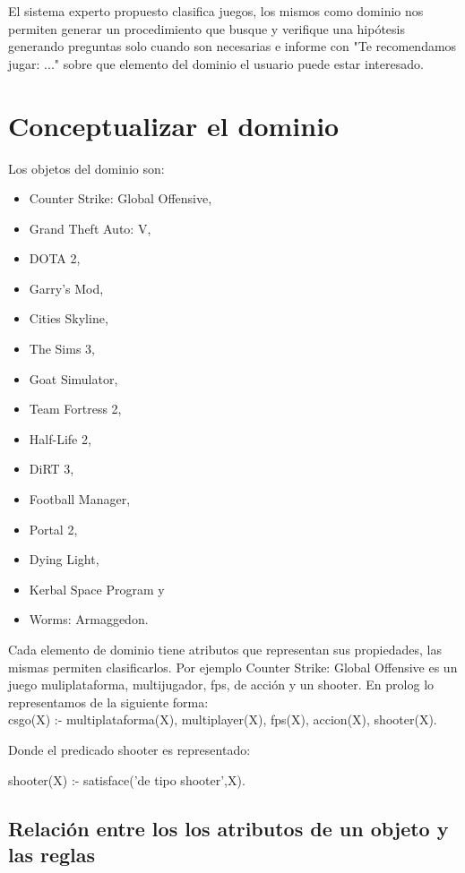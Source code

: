 \documentclass[11pt,oneside,a4paper]{article}
\begin{document}
El sistema experto propuesto clasifica juegos, los mismos como 
dominio nos permiten generar un procedimiento que busque y verifique
una hipótesis generando preguntas solo cuando son necesarias e informe con          %
"Te recomendamos jugar: ..." sobre que elemento del dominio el
usuario puede estar interesado.


\section{Conceptualizar el dominio}

Los objetos del dominio son:

\begin{multicols}{2}
\begin{itemize}
\item Counter Strike: Global Offensive,
\item Grand Theft Auto: V,
\item DOTA 2,
\item Garry's Mod,
\item Cities Skyline,
\item The Sims 3,
\item Goat Simulator,
\item Team Fortress 2,
\item Half-Life 2,
\item DiRT 3,
\item Football Manager,
\item Portal 2,
\item Dying Light,
\item Kerbal Space Program y
\item Worms: Armaggedon.
\end{itemize}
\end{multicols}

Cada elemento de dominio tiene atributos que representan sus propiedades, las
mismas permiten clasificarlos. Por ejemplo Counter Strike: Global Offensive
es un juego muliplataforma, multijugador, fps, de acción y un shooter. En prolog 
lo representamos de la siguiente forma:\\

csgo(X) :- multiplataforma(X), multiplayer(X), fps(X), accion(X), shooter(X).

Donde el predicado shooter es representado: 

shooter(X) :- satisface('de tipo shooter',X).


\subsection{Relación entre los los atributos de un objeto y las reglas}
\end{document}
